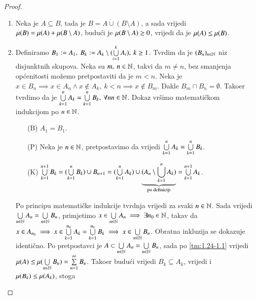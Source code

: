 \begin{proof}
    \begin{enumerate}[label={(\roman*)}]
        \item Neka je $A \subseteq B$, tada je $B = A \dot{\cup} (B \setminus A)$, a sada
            vrijedi $\mu({B}) = \mu({A}) + \mu({B \setminus A})$, budu\' ci je
            $\mu({B \setminus A}) \geq 0$, vrijedi da je $\mu({A}) \leq \mu({B})$.

        \item Definiramo $B_1 := A_1, \: B_k := A_k \setminus (\bigcup\limits_{i=1}^{k} A_i),
            \: k \geq 1$. Tvrdim da je $(B_n)_{n \in \mathbb{N}}$ niz disjunktnih skupova.
            Neka su $m, \: n \in \mathbb{N}$, takvi da $m \neq n$, bez smanjenja op\' cenitosti
            mo\v zemo pretpostaviti da je $m < n$. Neka je $x \in B_n \implies x \in A_n 
            \land x \notin A_k, \: k < n \implies x \notin B_m$.
            Dakle $B_m \cap B_n = \emptyset.$ Tako\dj er tvrdimo da je $\bigcup\limits_{k=1}^{n} A_k
            = \bigcup\limits_{k=1}^{n} B_k, \: \forall n n \in \mathbb{N}$.
            Dokaz vr\v simo matemati\v ckom indukcijom po $n \in \mathbb{N}$.
            \begin{enumerate}
                \item[(B)] $A_1 = B_1$.
                \item[(P)] Neka je $n \in \mathbb{N}$, pretpostavimo da vrijedi $\bigcup\limits_{k=1}^{n} A_k
                = \bigcup\limits_{k=1}^{n} B_k$.
                \item[(K)] $\bigcup\limits_{k=1}^{n+1} B_k = (\bigcup\limits_{k=1}^{n} B_k) \cup B_{n+1}
                    = (\bigcup\limits_{k=1}^{n} A_k) \cup \underbrace{(A_n \setminus
                    \bigcup\limits_{k=1}^{n} A_k)}_{\textnormal{po definiciji}}
                    = \bigcup\limits_{k=1}^{n+1} A_k$.
            \end{enumerate}
            Po principu matemati\v cke indukcije tvrdnja vrijedi za svaki $n \in \mathbb{N}$.
            Sada vrijedi $\bigcup\limits_{n \in \mathbb{N}}^{} A_n = \bigcup\limits_{n \in \mathbb{N}}^{} B_n$, primjetimo
            $x \in \bigcup\limits_{n \in \mathbb{N}}^{} A_n \implies \exists n_0 \in \mathbb{N}$, takav da
            $x \in A_{n_0} \implies x \in \bigcup\limits_{k=1}^{n_0} A_k = \bigcup\limits_{k=1}^{n_0} B_k
            \implies x \in \bigcup\limits_{n \in \mathbb{N}}^{} B_n$. Obratna inkluzija se dokazuje identi\v
            cno.
            Po pretpostavci je $A \subset \bigcup\limits_{n \in \mathbb{N}}^{} A_n = \bigcup\limits_{n \in \mathbb{N}}^{} B_n$,
            sada po \ref{tm:1.24-1.1} vrijedi $\mu({A}) \leq
            \mu({\bigcup\limits_{n \in \mathbb{N}}^{} B_n}) = \sum\limits_{n=1}^{\infty} B_n$. Tako\dj er budu\' ci
            vrijedi $B_k \subseteq A_k$, vrijedi i $\mu({B_k}) \leq \mu({A_k})$, stoga

\end{enumerate}
\end{proof}
